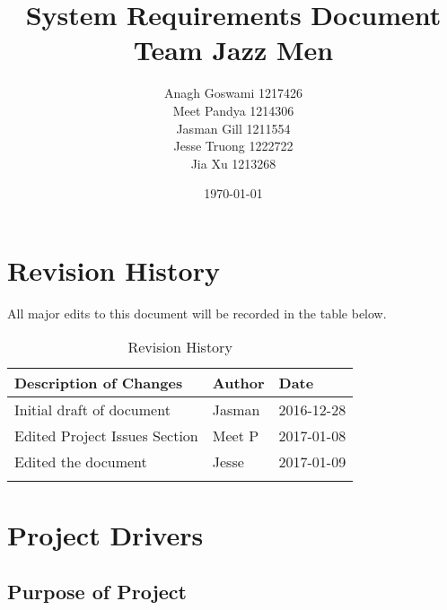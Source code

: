 \documentclass[12pt]{article}
\begin{document}
\title{System Requirements Document\\Team Jazz Men} 
\author{Anagh Goswami 1217426 \\ Meet Pandya 1214306 \\ Jasman Gill  1211554 \\ Jesse Truong  1222722 \\ Jia Xu  1213268 \\}
\date{\today}
\maketitle


\newpage

\tableofcontents
\newpage
{}
\restoregeometry

\section{Revision History}
All major edits to this document will be recorded in the table below.

\begin{table}[h]
\centering
\caption{Revision History}
\begin{tabular}{|l|l|l|}
\Xhline{2\arrayrulewidth}
\bf Description of Changes & \bf Author & \bf Date\\\hline
Initial draft of document & Jasman & 2016-12-28\\
Edited Project Issues Section & Meet P & 2017-01-08\\
Edited the document & Jesse & 2017-01-09\\
\Xhline{2\arrayrulewidth}
\end{tabular}
\end{table}

\newpage
\section{Project Drivers}

\subsection{Purpose of Project} %
\end{document}
